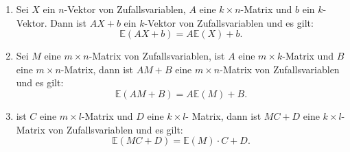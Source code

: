\documentclass[10pt]{article}
\newcommand{\EW}{\mathbb{E}} %
\begin{document}
			\begin{Proposition}
				\begin{enumerate}
					\item Sei $X$ ein $n$-Vektor von Zufallsvariablen, $A$ eine $k \times n$-Matrix und $b$ ein $k$-Vektor. Dann ist $AX+b$ ein $k$-Vektor von Zufallsvariablen und es gilt:
					\begin{equation*}
						\EW(AX+b) = A \EW(X)+b.
					\end{equation*}
					\item Sei $M$ eine $m\times n$-Matrix von Zufallsvariablen, ist $A$ eine $m \times k$-Matrix und $B$ eine $m \times n$-Matrix, dann ist $AM+B$ eine $m \times n$-Matrix von Zufallsvariablen und es gilt:
					\begin{equation*}
						\EW(AM+B) = A\EW(M)+B.
					\end{equation*}
					\item  ist $C$ eine $m \times l$-Matrix und $D$ eine $k\times l$- Matrix, dann ist $MC+D$ eine $k \times l$-Matrix von Zufallsvariablen und es gilt:
					\begin{equation*}
						\EW(MC+D) = \EW(M) \cdot C + D.
					\end{equation*}
				\end{enumerate}
			\end{Proposition}
			
\end{document}
